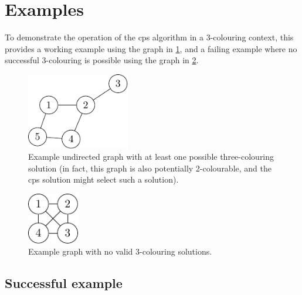 \section{\label{sec:gcol:examples}Examples}

To demonstrate the operation of the \gls{cps} algorithm in a 3-colouring context, this  provides a working example using the graph in \cref{fig:gcol:examplegraph}, and a failing example where no successful 3-colouring is possible using the graph in \cref{fig:gcol:examplegraphnosol}.

\begin{figure}
    \centering
    \includegraphics[width=0.4\textwidth]{chapters/gcol/figs/examplegraph1-figure2.pdf}
    \caption[Example graph with at least one possible three-colouring solution]{Example undirected graph with at least one possible three-colouring solution (in fact, this graph is also potentially 2-colourable, and the \gls{cps} solution might select such a solution).}
    \label{fig:gcol:examplegraph}
\end{figure}

\begin{figure}
    \centering
    \includegraphics[width=0.2\textwidth]{chapters/gcol/figs/examplegraph1-figure3.pdf}
    \caption{Example graph with no valid 3-colouring solutions.}
    \label{fig:gcol:examplegraphnosol}
\end{figure}

\subsection{Successful example}


